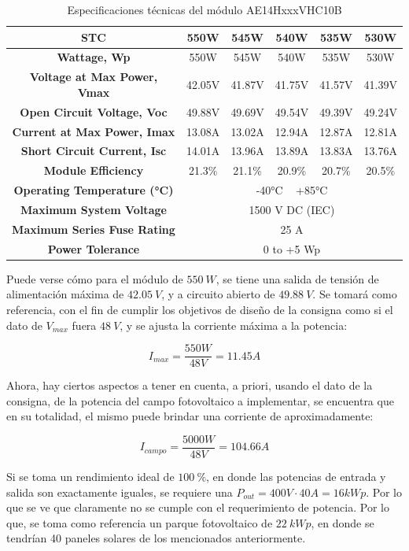 \begin{table}[h]
	\centering
	\begin{tabular}{|c|c|c|c|c|c|}
		\hline
		\textbf{STC} & \textbf{550W} & \textbf{545W} & \textbf{540W} & \textbf{535W} & \textbf{530W} \\ \hline
		\textbf{Wattage, Wp} & 550W & 545W & 540W & 535W & 530W \\ \hline
		\textbf{Voltage at Max Power, Vmax} & 42.05V & 41.87V & 41.75V & 41.57V & 41.39V \\ \hline
		\textbf{Open Circuit Voltage, Voc} & 49.88V & 49.69V & 49.54V & 49.39V & 49.24V \\ \hline
		\textbf{Current at Max Power, Imax} & 13.08A & 13.02A & 12.94A & 12.87A & 12.81A \\ \hline
		\textbf{Short Circuit Current, Isc} & 14.01A & 13.96A & 13.89A & 13.83A & 13.76A \\ \hline
		\textbf{Module Efficiency} & 21.3\% & 21.1\% & 20.9\% & 20.7\% & 20.5\% \\ \hline
		\textbf{Operating Temperature (°C)} & \multicolumn{5}{c|}{-40°C ~ +85°C} \\ \hline
		\textbf{Maximum System Voltage} & \multicolumn{5}{c|}{1500 V DC (IEC)} \\ \hline
		\textbf{Maximum Series Fuse Rating} & \multicolumn{5}{c|}{25 A} \\ \hline
		\textbf{Power Tolerance} & \multicolumn{5}{c|}{0 to +5 Wp} \\ \hline
	\end{tabular}
	\caption{Especificaciones técnicas del módulo AE14HxxxVHC10B}
	\label{tab:module_specs}
\end{table}

Puede verse cómo para el módulo de $550 \ W$, se tiene una salida de tensión de alimentación máxima de $42.05 \ V$, y a circuito abierto de $49.88 \ V$. Se tomará como referencia, con el fin de cumplir los objetivos de diseño de la consigna como si el dato de $V_{max}$ fuera $48 \ V$, y se ajusta la corriente máxima a la potencia:

$$
I_{max} = \frac{550W}{48V}= 11.45A
$$

Ahora, hay ciertos aspectos a tener en cuenta, a priori, usando el dato de la consigna, de la potencia del campo fotovoltaico a implementar, se encuentra que en su totalidad, el mismo puede brindar una corriente de aproximadamente:

$$
I_{campo}=\frac{5000W}{48V}=104.66 A
$$

Si se toma un rendimiento ideal de $100 \ \%$, en donde las potencias de entrada y salida son exactamente iguales, se requiere una $P_{out}=400V\cdot 40A=16kWp$. Por lo que se ve que claramente no se cumple con el requerimiento de potencia. Por lo que, se toma como referencia un parque fotovoltaico de $22 \ kWp$, en donde se tendrían 40 paneles solares de los mencionados anteriormente. 

